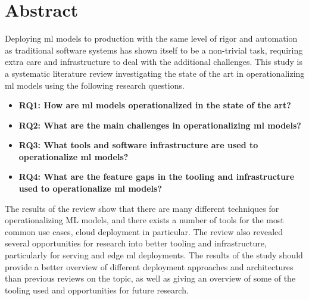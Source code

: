 \chapter*{Abstract}
Deploying \acrfull{ml} models to production with the same level of rigor and automation as traditional software systems has shown itself to be a non-trivial task, requiring extra care and infrastructure to deal with the additional challenges.
This study is a systematic literature review investigating the state of the art in operationalizing \acrshort{ml} models using the following research questions.
\begin{itemize}
    \item \textbf{RQ1: How are \acrshort{ml} models operationalized in the state of the art?}
    \item \textbf{RQ2: What are the main challenges in operationalizing \acrshort{ml} models?}
    \item \textbf{RQ3: What tools and software infrastructure are used to operationalize \acrshort{ml} models?}
    \item \textbf{RQ4: What are the feature gaps in the tooling and infrastructure used to operationalize \acrshort{ml} models?}
\end{itemize}
The results of the review show that there are many different techniques for operationalizing ML models, and there exists a number of tools for the most common use cases, cloud deployment in particular. 
The review also revealed several opportunities for research into better tooling and infrastructure, particularly for serving and edge \acrshort{ml} deployments.
The results of the study should provide a better overview of different deployment approaches and architectures than previous reviews on the topic, as well as giving an overview of some of the tooling used and opportunities for future research.